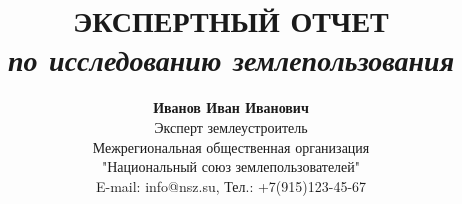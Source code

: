 
\newcommand{\DefaultOrganizationName}{Межрегиональная общественная организация \\"Национальный союз землепользователей"}
\newcommand{\DefaultOrganizationAddress}{125009, г. Москва, пер. Старопименовский, д. 13, стр 4}
\newcommand{\DefaultOrganizationPhone}{+7(915)123-45-67}
\newcommand{\DefaultOrganizationEmail}{info@nsz.su}
\newcommand{\DefaultOrganizationWebsite}{https://nsz.su/}

\newcommand{\DefaultExpertName}{Иванов Иван Иванович}
\newcommand{\DefaultExpertPosition}{Эксперт землеустроитель}
\newcommand{\DefaultExpertContacts}{\texttt{+7(916)123-45-67}, \texttt{expert@yandex.ru}}

\newcommand{\DefaultReportTitle}{ЭКСПЕРТНЫЙ ОТЧЕТ}
\newcommand{\DefaultReportSubject}{по исследованию землепользования}
\newcommand{\DefaultReportCity}{Москва}
\newcommand{\DefaultReportYear}{\the\year}
\newcommand{\DefaultReportDate}{\the\year}

\newcommand{\DefaultHeaderText}{Экспертное заключение}


\newcommand{\OrganizationName}{\DefaultOrganizationName}
\newcommand{\OrganizationAddress}{\DefaultOrganizationAddress}
\newcommand{\OrganizationPhone}{\DefaultOrganizationPhone}
\newcommand{\OrganizationEmail}{\DefaultOrganizationEmail}
\newcommand{\OrganizationWebsite}{\DefaultOrganizationWebsite}

\newcommand{\ExpertName}{\DefaultExpertName}
\newcommand{\ExpertPosition}{\DefaultExpertPosition}
\newcommand{\ExpertContacts}{\DefaultExpertContacts}

\newcommand{\ReportTitle}{\DefaultReportTitle}
\newcommand{\ReportSubject}{\DefaultReportSubject}
\newcommand{\ReportCity}{\DefaultReportCity}
\newcommand{\ReportYear}{\DefaultReportYear}
\newcommand{\ReportDate}{\DefaultReportDate}

\newcommand{\HeaderText}{\DefaultHeaderText}

 \title{
     \LARGE\textbf{\ReportTitle} \\
     \large\textit{\ReportSubject}
 }
 
 \author{
     \small\textbf{\ExpertName} \\[4pt]
     \small \ExpertPosition \\
     \small \OrganizationName \\
     \small {E-mail: \OrganizationEmail}, \small {Тел.: \OrganizationPhone}
 }
 
 \date{
     \small\textbf{\ReportDate} \\[4pt]
 }
